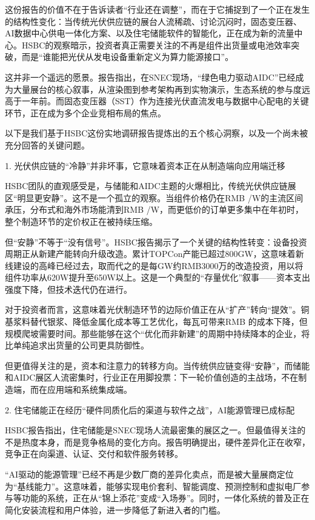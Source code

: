 \documentclass[11pt]{ctexart}
\begin{document}
这份报告的价值不在于告诉读者“行业还在调整”，而在于它捕捉到了一个正在发生的结构性变化：当传统光伏供应链的展台人流稀疏、讨论沉闷时，固态变压器、AI数据中心供电一体化方案、以及住宅储能软件的智能化，正在成为新的流量中心。HSBC的观察暗示，投资者真正需要关注的不再是组件出货量或电池效率突破，而是“谁能把光伏从发电设备重新定义为算力能源接口”。

这并非一个遥远的愿景。报告指出，在SNEC现场，“绿色电力驱动AIDC”已经成为大量展台的核心叙事，从渲染图到参考架构再到实物演示，生态系统的参与度远高于一年前。而固态变压器（SST）作为连接光伏直流发电与数据中心配电的关键环节，正在成为多个企业竞相布局的焦点。

以下是我们基于HSBC这份实地调研报告提炼出的五个核心洞察，以及一个尚未被充分回答的关键问题。

1. 光伏供应链的“冷静”并非坏事，它意味着资本正在从制造端向应用端迁移

HSBC团队的直观感受是，与储能和AIDC主题的火爆相比，传统光伏供应链展区“明显更安静”。这不是一个孤立的观察。当组件价格仍在RMB /W的主流区间承压，分布式和海外市场能清到RMB /W，而更低价的订单更多集中在年初时，整个制造环节的定价权正在被持续压缩。

但“安静”不等于“没有信号”。HSBC报告揭示了一个关键的结构性转变：设备投资周期正从新建产能转向升级改造。累计TOPCon产能已超过800GW，这意味着新线建设的高峰已经过去，取而代之的是每GW约RMB3000万的改造投资，用以将组件功率从620W提升至650W以上。这是一个典型的“存量优化”叙事——资本支出强度下降，但技术迭代仍在进行。

对于投资者而言，这意味着光伏制造环节的边际价值正在从“扩产”转向“提效”。铜基浆料替代银浆、降低金属化成本等工艺优化，每瓦可带来RMB 的成本下降，但规模爬坡需要时间。那些能够在这个“优化而非新建”的周期中持续降本的企业，将比单纯追求出货量的公司更具防御性。

但更值得关注的是，资本和注意力的转移方向。当传统供应链变得“安静”，而储能和AIDC展区人流密集时，行业正在用脚投票：下一轮价值创造的主战场，不在制造端，而在应用端和系统集成端。

2. 住宅储能正在经历“硬件同质化后的渠道与软件之战”，AI能源管理已成标配

HSBC报告指出，住宅储能是SNEC现场人流最密集的展区之一。但最值得关注的不是热度本身，而是竞争格局的变化方向。报告明确提出，硬件差异化正在收窄，竞争正在向渠道、认证、交付和软件服务转移。

“AI驱动的能源管理”已经不再是少数厂商的差异化卖点，而是被大量展商定位为“基线能力”。这意味着，能够实现电价套利、智能调度、预测控制和虚拟电厂参与等功能的系统，正在从“锦上添花”变成“入场券”。同时，一体化系统的普及正在简化安装流程和用户体验，进一步降低了新进入者的门槛。
\end{document}
